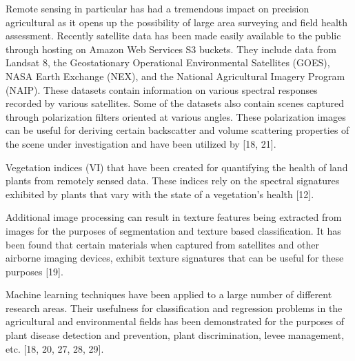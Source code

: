 Remote sensing in particular has had a tremendous impact on precision agricultural as it opens up the possibility of large area surveying and field health assessment.  Recently satellite data has been made easily available to the public through hosting on Amazon Web Services S3 buckets.  They include data from Landsat 8, the Geostationary Operational Environmental Satellites (GOES), NASA Earth Exchange (NEX), and the National Agricultural Imagery Program (NAIP).  These datasets contain information on various spectral responses recorded by various satellites.  Some of the datasets also contain scenes captured through polarization filters oriented at various angles. These polarization images can be useful for deriving certain backscatter and volume scattering properties of the scene under investigation and have been utilized by [18, 21].

Vegetation indices (VI) that have been created for quantifying the health of land plants from remotely sensed data.  These indices rely on the spectral signatures exhibited by plants that vary with the state of a vegetation’s health [12].

Additional image processing can result in texture features being extracted from images for the purposes of segmentation and texture based classification.  It has been found that certain materials when captured from satellites and other airborne imaging devices, exhibit texture signatures that can be useful for these purposes [19].

Machine learning techniques have been applied to a large number of different research areas.  Their usefulness for classification and regression problems in the agricultural and environmental fields has been demonstrated for the purposes of plant disease detection and prevention, plant discrimination, levee management, etc. [18, 20, 27, 28, 29].
